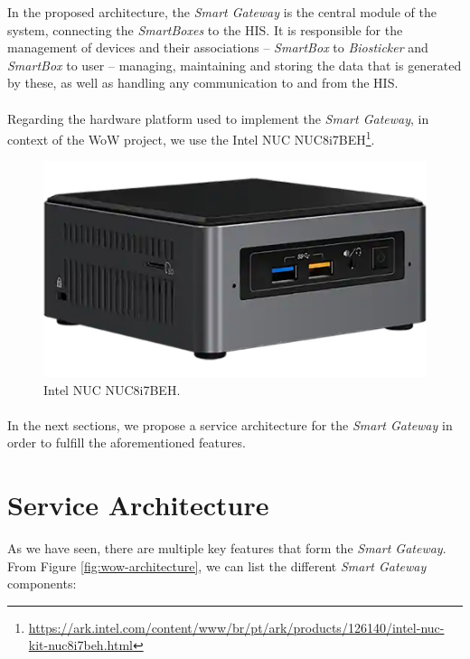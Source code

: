

In the proposed architecture, the \textit{Smart Gateway} is the central module of the system, connecting the \textit{SmartBoxes} to the \acs{HIS}. It is responsible for the management of devices and their associations -- \textit{SmartBox} to \textit{Biosticker} and \textit{SmartBox} to user -- managing, maintaining and storing the data that is generated by these, as well as handling any communication to and from the \acs{HIS}. 


\paragraph{} Regarding the hardware platform used to implement the \textit{Smart Gateway}, in context of the \acs{WoW} project, we use the Intel NUC NUC8i7BEH\footnote{\url{https://ark.intel.com/content/www/br/pt/ark/products/126140/intel-nuc-kit-nuc8i7beh.html}}.

\begin{figure}[H]
    \centering
    \includegraphics[width=0.4\linewidth]{images/gateway-image.png}
    \caption[Intel NUC NUC8i7BEH.]{Intel NUC NUC8i7BEH.}
    \label{fig:gateway_image}
\end{figure}


\paragraph{} In the next sections, we propose a service architecture for the \textit{Smart Gateway} in order to fulfill the aforementioned features.



\section{Service Architecture}

As we have seen, there are multiple key features that form the \textit{Smart Gateway}. From Figure \ref{fig:wow-architecture}, we can list the different \textit{Smart Gateway} components:  

